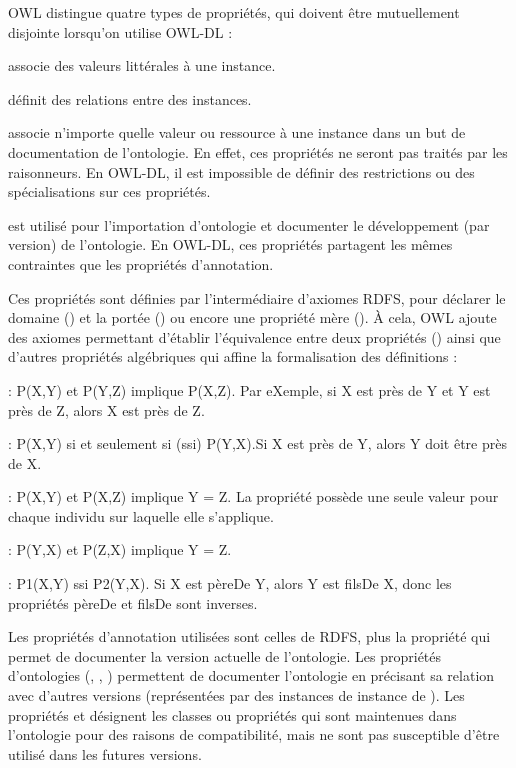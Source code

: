 OWL distingue quatre types de propriétés, qui doivent être mutuellement disjointe lorsqu'on utilise OWL-DL :
\begin{liste}
	\item {} associe des valeurs littérales à une instance.
	\item {} définit des relations entre des instances.
	\item {} associe n'importe quelle valeur ou ressource à une instance dans un but de documentation de l'ontologie. 
  En effet, ces propriétés ne seront pas traités par les raisonneurs.
  En OWL-DL, il est impossible de définir des restrictions ou des spécialisations sur ces propriétés.
	\item {} est utilisé pour l'importation d'ontologie et documenter le développement (par version) de l'ontologie.
	En OWL-DL, ces propriétés partagent les mêmes contraintes que les propriétés d'annotation.
\end{liste}

Ces propriétés sont définies par l'intermédiaire d'axiomes RDFS, pour déclarer le domaine () et la portée () ou encore une propriété mère ().
À cela, OWL ajoute des axiomes permettant d'établir l'équivalence entre deux propriétés () ainsi que d'autres propriétés algébriques qui affine la formalisation des définitions : 
\begin{liste}
  \item {}: P(X,Y) et P(Y,Z) implique P(X,Z). 
  Par eXemple, si X est près de Y et Y est près de Z, alors X est près de Z.
  \item {}: P(X,Y) si et seulement si (ssi) P(Y,X).Si X est près de Y, alors Y doit être près de X.
  \item {}: P(X,Y) et P(X,Z) implique Y = Z. 
  La propriété possède une seule valeur pour chaque individu sur laquelle elle s'applique.
  \item {}: P(Y,X) et P(Z,X) implique Y = Z.
  \item {}: P1(X,Y) ssi P2(Y,X). 
  Si X est pèreDe Y, alors Y est filsDe X, donc les propriétés pèreDe et filsDe sont inverses.
\end{liste}

Les propriétés d'annotation utilisées sont celles de RDFS, plus la propriété  qui permet de documenter la version actuelle de l'ontologie.
Les propriétés d'ontologies (, , ) permettent de documenter l'ontologie en précisant sa relation avec d'autres versions (représentées par des instances de instance de ).
Les propriétés  et  désignent les classes ou propriétés qui sont maintenues dans l'ontologie pour des raisons de compatibilité, mais ne sont pas susceptible d'être utilisé dans les futures versions.

